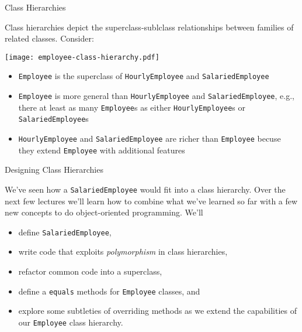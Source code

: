 \documentclass{beamer}
\begin{document}
\begin{frame}[fragile]{Class Hierarchies}

\vspace{-.05in}
Class hierarchies depict the superclass-sublclass relationships between families of related classes.  Consider:
\vspace{-.05in}
\begin{center}
\texttt{[image: employee-class-hierarchy.pdf]}
\end{center}
\vspace{-.2in}
\begin{itemize}
\item {\tt Employee} is the superclass of {\tt HourlyEmployee} and {\tt SalariedEmployee}
\item {\tt Employee} is more general than {\tt HourlyEmployee} and {\tt SalariedEmployee}, e.g., there at least as many {\tt Employee}s as either {\tt HourlyEmployee}s or {\tt SalariedEmployee}s
\item {\tt HourlyEmployee} and {\tt SalariedEmployee} are richer than {\tt Employee} becuse they extend {\tt Employee} with additional features
\end{itemize}


\end{frame}

\begin{frame}[fragile]{Designing Class Hierarchies}


We've seen how a {\tt SalariedEmployee} would fit into a class hierarchy.  Over the next few lectures we'll learn how to combine what we've learned so far with a few new concepts to do object-oriented programming.  We'll
\begin{itemize}
\item define {\tt SalariedEmployee},
\item write code that exploits {\it polymorphism} in class hierarchies,
\item refactor common code into a superclass,
\item define a {\tt equals} methods for {\tt Employee} classes, and
\item explore some subtleties of overriding methods as we extend the capabilities of our {\tt Employee} class hierarchy.
\end{itemize}


\end{frame}









\end{document}
